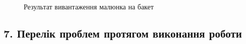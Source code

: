 \documentclass[a4paper,14pt]{extarticle} %
\begin{document}
\begin{figure}[H]
    \caption{Результат вивантаження малюнка на бакет}
    \label{fig:png on s3}
\end{figure}

\subsection*{7. Перелік проблем протягом виконання роботи}
\end{document}
